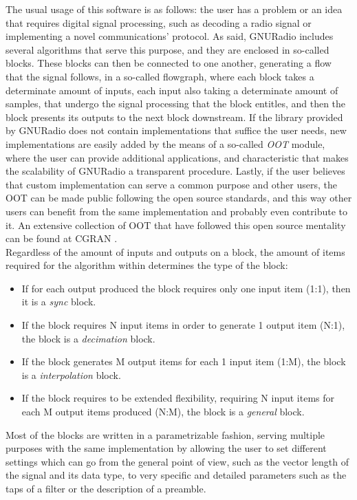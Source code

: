 The usual usage of this software is as follows: the user has a problem or an idea that requires digital signal processing, such as decoding a radio signal or implementing a novel communications' protocol. As said, GNURadio includes several algorithms that serve this purpose, and they are enclosed in so-called blocks. These blocks can then be connected to one another, generating a flow that the signal follows, in a so-called flowgraph, where each block takes a determinate amount of inputs, each input also taking a determinate amount of samples, that undergo the signal processing that the block entitles, and then the block presents its outputs to the next block downstream. If the library provided by GNURadio does not contain implementations that suffice the user needs, new implementations are easily added by the means of a so-called \emph{\ac{OOT}} module, where the user can provide additional applications, and characteristic that makes the scalability of GNURadio a transparent procedure. Lastly, if the user believes that custom implementation can serve a common purpose and other users, the \ac{OOT} can be made public following the open source standards, and this way other users can benefit from the same implementation and probably even contribute to it. An extensive collection of \ac{OOT} that have followed this open source mentality can be found at \ac{CGRAN} \cite{CGRAN}.\\

Regardless of the amount of inputs and outputs on a block, the amount of items required for the algorithm within determines the type of the block:

\begin{itemize}
    \item If for each output produced the block requires only one input item (1:1), then it is a \emph{sync} block.
    \item If the block requires N input items in order to generate 1 output item (N:1), the block is a \emph{decimation} block.
    \item If the block generates M output items for each 1 input item (1:M), the block is a \emph{interpolation} block.
    \item If the block requires to be extended flexibility, requiring N input items for each M output items produced (N:M), the block is a \emph{general} block.
\end{itemize}

Most of the blocks are written in a parametrizable fashion, serving multiple purposes with the same implementation by allowing the user to set different settings which can go from the general point of view, such as the vector length of the signal and its data type, to very specific and detailed parameters such as the taps of a filter or the description of a preamble. \\

